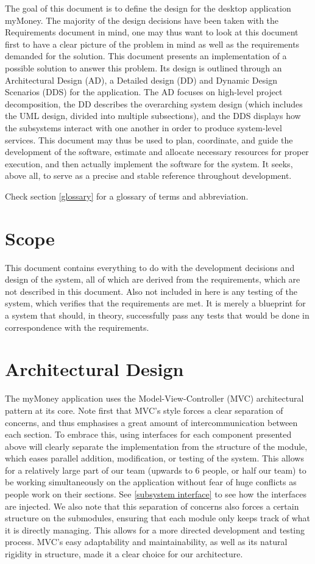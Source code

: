 \documentclass[12pt]{article}
\begin{document}
The goal of this document is to define the design for the desktop application myMoney. The majority of the design decisions have been taken     with the Requirements document in mind, one may thus want to look at this document first to have a clear picture of the problem in mind as well as the requirements demanded for the solution. This document presents an implementation of a possible solution to answer this problem. Its design is outlined through an Architectural Design (AD), a Detailed design (DD) and Dynamic Design Scenarios (DDS) for the application. The AD focuses on high-level project decomposition, the DD describes the overarching system design (which includes the UML design, divided into multiple subsections), and the DDS displays how the subsystems interact with one another in order to produce system-level services. This document may thus be used to plan, coordinate, and guide the development of the software, estimate and allocate necessary resources for proper execution, and  then actually implement the software for the system. It seeks, above all, to serve as a precise and stable reference throughout development.

Check section \ref{glossary} for a glossary of terms and abbreviation.

\section{Scope}

This document contains everything to do with the development decisions and design of the system, all of which are derived from the requirements, which are not described in this document. Also not included in here is any testing of the system, which verifies that the requirements are met. It is merely a blueprint for a system that should, in theory, successfully pass any tests that would be done in correspondence with the requirements.

\section{Architectural Design} \label{sec:arch}

The myMoney application uses the Model-View-Controller (MVC) architectural pattern at its core. Note first that MVC's style forces a clear separation of concerns, and thus emphasises a great amount of intercommunication between each section. To embrace this, using interfaces for each component presented above will clearly separate the implementation from the structure of the module, which eases parallel addition, modification, or testing of the system. This allows for a relatively large part of our team (upwards to 6 people, or half our team) to be working simultaneously on the application without fear of huge conflicts as people work on their sections. See \ref{subsystem interface} to see how the interfaces are injected. We also note that this separation of concerns also forces a certain structure on the submodules, ensuring that each module only keeps track of what it is directly managing. This allows for a more directed development and testing process. MVC's easy adaptability and maintainability, as well as its natural rigidity in structure, made it a clear choice for our architecture.
 
\end{document}
